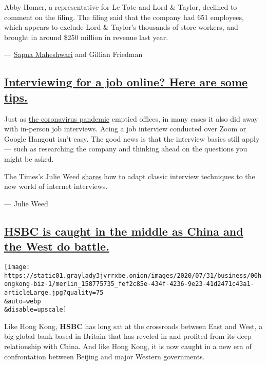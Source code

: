 Abby Homer, a representative for Le Tote and Lord \& Taylor, declined to
comment on the filing. The filing said that the company had 651
employees, which appears to exclude Lord \& Taylor's thousands of store
workers, and brought in around \$250 million in revenue last year.

--- \href{https://www.nytimes3xbfgragh.onion/by/sapna-maheshwari}{Sapna
Maheshwari} and Gillian Friedman

\hypertarget{interviewing-for-a-job-online-here-are-some-tips}{%
\subsection{\texorpdfstring{\protect\hyperlink{interviewing-for-a-job-online-here-are-some-tips}{Interviewing
for a job online? Here are some
tips.}}{Interviewing for a job online? Here are some tips.}}\label{interviewing-for-a-job-online-here-are-some-tips}}

Just as
\href{https://www.nytimes3xbfgragh.onion/news-event/coronavirus}{the
coronavirus pandemic} emptied offices, in many cases it also did away
with in-person job interviews. Acing a job interview conducted over Zoom
or Google Hangout isn't easy. The good news is that the interview basics
still apply --- such as researching the company and thinking ahead on
the questions you might be asked.

The Times's Julie Weed
\href{https://www.nytimes3xbfgragh.onion/2020/08/03/business/online-job-interview-tips.html}{shares}
how to adapt classic interview techniques to the new world of internet
interviews.

--- Julie Weed

\hypertarget{hsbc-is-caught-in-the-middle-as-china-and-the-west-do-battle}{%
\subsection{\texorpdfstring{\protect\hyperlink{hsbc-is-caught-in-the-middle-as-china-and-the-west-do-battle}{HSBC
is caught in the middle as China and the West do
battle.}}{HSBC is caught in the middle as China and the West do battle.}}\label{hsbc-is-caught-in-the-middle-as-china-and-the-west-do-battle}}

\texttt{[image: https://static01.graylady3jvrrxbe.onion/images/2020/07/31/business/00hongkong-biz-1/merlin\_158775735\_fef2c85e-434f-4236-9e23-41d2471c43a1-articleLarge.jpg?quality=75\\\&auto=webp\\\&disable=upscale]}

Like Hong Kong, \textbf{HSBC} has long sat at the crossroads between
East and West, a big global bank based in Britain that has reveled in
and profited from its deep relationship with China. And like Hong Kong,
it is now caught in a new era of confrontation between Beijing and major
Western governments.

